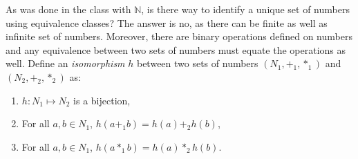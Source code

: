\documentclass[]{article}
\newcommand{\N}{\mathbb{N}}
\begin{document}
As was done in the class with $\N$, is there way to identify a unique set of numbers using equivalence classes? The answer is no, as there can be finite as well as infinite set of numbers. Moreover, there are binary operations defined on numbers and any equivalence between two sets of numbers must equate the operations as well. Define an {\em isomorphism} $h$ between two sets of numbers $(N_1, +_1, *_1)$ and $(N_2, +_2, *_2)$ as:
\begin{enumerate}
	\item $h: N_1\mapsto N_2$ is a bijection,
	\item For all $a,b\in N_1$, $h(a+_1b) = h(a) +_2 h(b)$,
	\item For all $a,b\in N_1$, $h(a*_1b) = h(a) *_2 h(b)$.
\end{enumerate}
\end{document}
